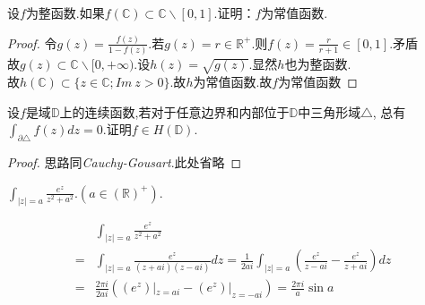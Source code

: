 \begin{eg}
	设$f$为整函数.如果$f(\mathbb{C})\subset\mathbb{C}\backslash[0,1]$.证明：$f$为常值函数.
\end{eg}
\begin{proof}
	令$\displaystyle{g(z)=\frac{f(z)}{1-f(z)}}$.若$g(z)=r\in\mathbb{R}^+$.则$\displaystyle{f(z)=\frac{r}{r+1}\in[0,1]}$.矛盾\\
	故$g(z)\subset\mathbb{C}\backslash[0,+\infty)$.设$h(z)=\sqrt{g(z)}$.显然$h$也为整函数.\\
	故$h(\mathbb{C})\subset\{z\in\mathbb{C};I\!m\ z>0\}$.故$h$为常值函数.故$f$为常值函数
\end{proof}

\begin{eg}[更强形式的Morera]
	设$f$是域$\mathbb{D}$上的连续函数,若对于任意边界和内部位于$\mathbb{D}$中三角形域$\triangle$,
	总有$\int_{\partial\triangle}f(z)dz=0$.证明$f\in H(\mathbb{D})$.
\end{eg}
\begin{proof}
	思路同\emph{Cauchy-Gousart}.此处省略
\end{proof}

\begin{eg}
	$\displaystyle{\int_{|z|=a}\frac{e^z}{z^2+a^2}.(a\in\mathbb{(R)^+})}$.
\end{eg}
\begin{jie}
	\begin{align*}
	&\int_{|z|=a}\frac{e^z}{z^2+a^2}\\
	=&\int_{|z|=a}\frac{e^z}{(z+ai)(z-ai)}dz=\frac{1}{2ai}\int_{|z|=a}\left(\frac{e^z}{z-ai}-\frac{e^z}{z+ai}\right)dz\\
	=&\frac{2\pi i}{2ai}\left((e^z)|_{z=ai}-(e^z)|_{z=-ai}\right)=\frac{2\pi i}{a}\sin a
	\end{align*}
\end{jie}

